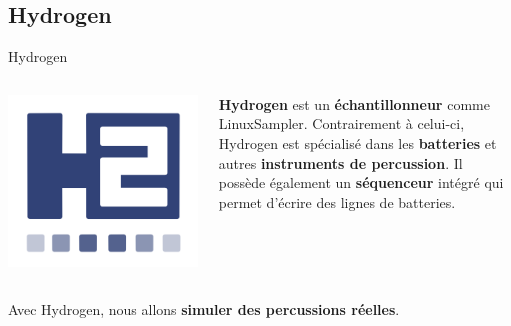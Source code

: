 \documentclass{beamer}
\begin{document}
\subsection{Hydrogen}
\begin{frame}{Hydrogen}
  \begin{columns}
  \begin{column}{0.15\textwidth}
    \includegraphics[width=\linewidth]{hydrogen_logo}
  \end{column}
  \begin{column}{0.85\textwidth}
    \textbf{Hydrogen} est un \textbf{échantillonneur} comme LinuxSampler. Contrairement à celui-ci, Hydrogen est spécialisé dans les \textbf{batteries} et autres \textbf{instruments de percussion}. Il possède également un \textbf{séquenceur} intégré qui permet d'écrire des lignes de batteries.
  \end{column}
  \end{columns}
  \medskip
    
  Avec Hydrogen, nous allons \textbf{simuler des percussions réelles}.
\end{frame}

\end{document}
